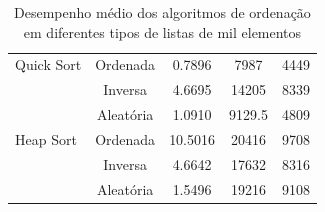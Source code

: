 \documentclass[tcc2]{uftex}
\begin{document}
\begin{table}[h]
\begin{tabular}{|l|c|c|c|c|}
Quick Sort        & Ordenada                & 0.7896                 & 7987                 & 4449    \\ \cline{2-5}
                   & Inversa                 & 4.6695                 & 14205                 & 8339    \\ \cline{2-5}
                   & Aleatória               & 1.0910                 & 9129.5                 & 4809    \\ \hline
Heap Sort         & Ordenada                & 10.5016                 & 20416                 & 9708    \\ \cline{2-5}
                   & Inversa                 & 4.6642                 & 17632                 & 8316    \\ \cline{2-5}
                   & Aleatória               & 1.5496                 & 19216                 & 9108    \\ \hline
\end{tabular}
\caption{Desempenho médio dos algoritmos de ordenação em diferentes tipos de listas de mil elementos}
\label{tab:sorting_algorithms}
\end{table}
\end{document}
